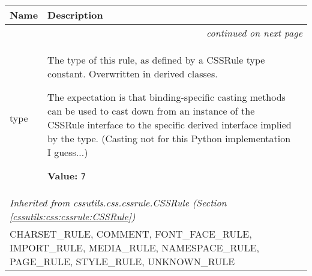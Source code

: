     \vspace{-1cm}
\hspace{\varindent}\begin{longtable}{|p{\varnamewidth}|p{\vardescrwidth}|l}
\cline{1-2}
\cline{1-2} \centering \textbf{Name} & \centering \textbf{Description}& \\
\cline{1-2}
\endhead\cline{1-2}\multicolumn{3}{r}{\small\textit{continued on next page}}\\\endfoot\cline{1-2}
\endlastfoot\raggedright t\-y\-p\-e\- & \raggedright The type of this rule, as defined by a CSSRule type constant.
Overwritten in derived classes.

The expectation is that binding-specific casting methods can be used to
cast down from an instance of the CSSRule interface to the specific
derived interface implied by the type.
(Casting not for this Python implementation I guess...)

\textbf{Value:} 
{\tt 7}&\\
\cline{1-2}
\multicolumn{2}{|l|}{\textit{Inherited from cssutils.css.cssrule.CSSRule \textit{(Section \ref{cssutils:css:cssrule:CSSRule})}}}\\
\multicolumn{2}{|p{\varwidth}|}{\raggedright CHARSET\_RULE, COMMENT, FONT\_FACE\_RULE, IMPORT\_RULE, MEDIA\_RULE, NAMESPACE\_RULE, PAGE\_RULE, STYLE\_RULE, UNKNOWN\_RULE}\\
\cline{1-2}
\end{longtable}

